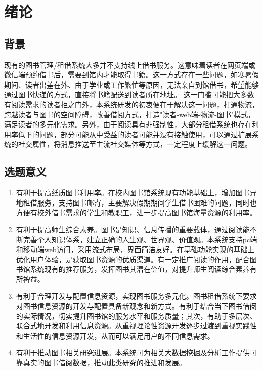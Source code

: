 
\chapter{绪论}
\section{背景}
现有的图书管理/租借系统大多并不支持线上借书服务。这意味着读者在网页端或微信端预约借书后，需要到馆内才能取得书籍。这一方式存在一些问题，如寒暑假期间、读者出差在外、由于学业或工作繁忙等原因，无法亲自到馆借书，希望能够通过图书快递的方式，直接将书籍配送到读者所在地址。
这一门槛可能把大多数有阅读需求的读者拒之门外，本系统研发的初衷便在于解决这一问题，打通物流，跨越读者与图书的空间障碍，改善借阅方式，打造"读者-web端-物流-图书"模式，满足读者的多元化需求。另外，由于阅读具有非强制性，大部分租借系统也存在利用率低下的问题，部分可能从中受益的读者可能并没有接触使用，可以通过扩展系统的社交属性，将消息推送至主流社交媒体等方式，一定程度上缓解这一问题。
\section{选题意义}
\begin{enumerate}
    \item 有利于提高纸质图书利用率。在校内图书馆系统现有功能基础上，增加图书异地租借服务，支持图书邮寄，主要解决假期期间学生借书困难的问题，同时也方便有校外借书需求的学生和教职工，进一步提高图书馆海量资源的利用率。
    \item 有利于提高师生综合素养。图书是知识、信息传播的重要载体，通过阅读能不断完善个人知识体系，建立正确的人生观、世界观、价值观。本系统支持pc端和移动端web访问，采用流式布局，界面简洁友好。在基础功能实现的基础上优化用户体验，是获取图书资源的优质渠道。有一定推广阅读的作用，配合图书馆系统现有的推荐服务，发挥图书其潜在价值，对提升师生阅读综合素养有所裨益。
    \item 有利于合理开发与配置信息资源，实现图书服务多元化。图书租借系统下要求对图书信息资源的开发与配置具备新观念和新方式。有利于结合当下图书借阅的实际情况，切实提升图书馆的服务水平和服务质量；其次，有助于多层次、联合式地开发和利用信息资源。从重视理论性资源开发逐步过渡到重视实践性和生活性的信息资源开发，从而可以满足用户的不同信息需求。
    \item 有利于推动图书相关研究进展。本系统可为相关大数据挖掘及分析工作提供可靠真实的图书借阅数据，推动此类研究的推进和发展。    
\end{enumerate}
